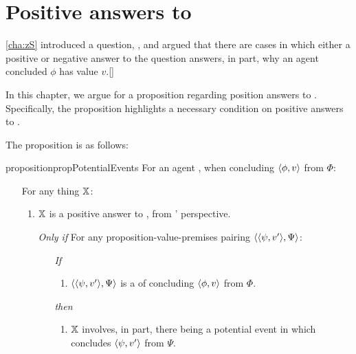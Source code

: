 \chapter{Positive answers to \qzS{}}
\label{cha:zSpA}

\nocite{Scriven:1962vq}
\nocite{Woodward:2021ue}
\nocite{Perry:1979vc}
\nocite{Perry:1986aa}

\begin{note}
  \autoref{cha:zS} introduced a question, \qzS{}, and argued that there are cases in which either a positive or negative answer to the question answers, in part, why an agent concluded \(\phi\) has value \(v\).[]

  In this chapter, we argue for a proposition regarding position answers to \qzS{}.
  Specifically, the proposition highlights a necessary condition on positive answers to \qzS{}.

  The proposition is as follows:

  \begin{restatable}{proposition}{propPotentialEvents}
    \label{prop:PWEs}
    For an agent \vAgent{}, when concluding \(\pv{\phi}{v}\) from \(\Phi\):

    \begin{itemize}
    \item[]
      For any thing \(\qzSaV{}\):
      \begin{enumerate}[label=\alph*., ref=(\alph*)]
      \item
        \label{prop:PWEs:a}
        \(\qzSaV{}\) is a positive answer to \qzS{}, from \vAgent{}' perspective.
      \end{enumerate}
      \begin{itemize}
      \item[\emph{Only if}]
        For any proposition-value-premises pairing \(\pvp{\psi}{v'}{\Psi}\):
        \begin{itemize}
        \item[\emph{If}]
          \begin{enumerate}[label=\alph*., ref=(\alph*), resume]
          \item
            \label{prop:PWEs:b}
            \(\pvp{\psi}{v'}{\Psi}\) is a \requ{} of \vAgent{} concluding \(\pv{\phi}{v}\) from \(\Phi\).
          \end{enumerate}
        \item[\emph{then}]
          \begin{enumerate}[label=\alph*., ref=(\alph*), resume]
          \item
            \label{prop:PWEs:c}
            \(\qzSaV{}\) involves, in part, there being a potential event in which \vAgent{} concludes \(\pv{\psi}{v'}\) from \(\Psi\).
          \end{enumerate}
        \end{itemize}
      \end{itemize}
    \end{itemize}
    \vspace{-\baselineskip}
  \end{restatable}
\end{note}

